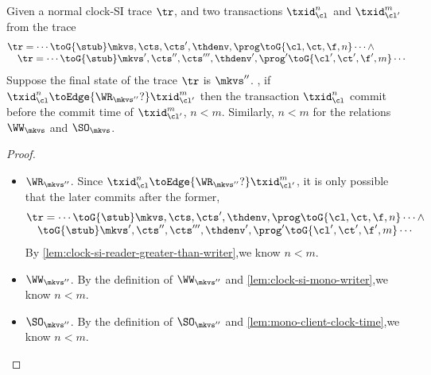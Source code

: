 \begin{lemma}
    \label{lem:clock-si-wr-ww-so}
    Given a normal clock-SI trace \( \tr \), and two transactions \( \txid_\cl^n \) and \( \txid_{\cl'}^m \) from the trace
    \[
        \begin{array}{@{}l@{}}
            \tr = \cdots \toG{\stub} \mkvs,\cts,\cts',\thdenv, \prog \toG{\cl,\ct,\f,n} \cdots \land \\
            \quad \tr = \cdots \toG{\stub} \mkvs',\cts'',\cts''',\thdenv', \prog' \toG{\cl',\ct',\f',m} \cdots
        \end{array}
    \]
    Suppose the final state of the trace \( \tr \) is \( \mkvs'' \).
    , if \( \txid_\cl^n \toEdge{\WR_{\mkvs''}?} \txid_{\cl'}^m \) then the transaction \( \txid_{\cl}^n \) commit before the commit time of \( \txid_{\cl'}^m \), \ie \( n < m \).
    Similarly, \( n <  m \) for the relations \( \WW_\mkvs \) and \( \SO_\mkvs \).
\end{lemma}
\begin{proof}
    \begin{itemize}
        \item \( \WR_{\mkvs''} \).
            Since  \( \txid_\cl^n \toEdge{\WR_{\mkvs''}?} \txid_{\cl'}^m \),
            it is only possible that the later commits after the former,
            \[
                \begin{array}{@{}l@{}}
                    \tr = \cdots \toG{\stub} \mkvs,\cts,\cts',\thdenv, \prog \toG{\cl,\ct,\f,n} \cdots \land \\
                    \quad \toG{\stub} \mkvs',\cts'',\cts''',\thdenv', \prog' \toG{\cl',\ct',\f',m} \cdots
                \end{array}
            \]
            By \cref{lem:clock-si-reader-greater-than-writer},we know \( n < m \).
        \item \( \WW_{\mkvs''} \).
            By the definition of  \( \WW_{\mkvs''} \) and \cref{lem:clock-si-mono-writer},we know \( n < m \).
        \item \( \SO_{\mkvs''} \).
            By the definition of  \( \SO_{\mkvs''} \) and \cref{lem:mono-client-clock-time},we know \( n < m \).
    \end{itemize}
\end{proof}

